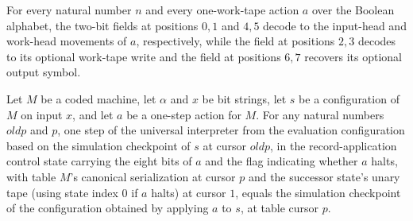 \begin{lemma}
\label{Turing.universalActionBits_decode}
\leanok
{}
For every natural number $n$ and every one-work-tape action $a$ over the Boolean
alphabet, the two-bit fields at positions $0,1$ and $4,5$ decode to the input-head and
work-head movements of $a$, respectively, while the field at positions $2,3$ decodes to
its optional work-tape write and the field at positions $6,7$ recovers its optional
output symbol.
\end{lemma}

\begin{lemma}
\label{Turing.universal_apply_record}
\leanok
{}
Let $M$ be a coded machine, let $\alpha$ and $x$ be bit strings, let $s$ be a
configuration of $M$ on input $x$, and let $a$ be a one-step action for $M$. For any
natural numbers $\mathit{oldp}$ and $p$, one step of the universal interpreter from the
evaluation configuration based on the simulation checkpoint of $s$ at cursor
$\mathit{oldp}$, in the record-application control state carrying the eight bits of $a$
and the flag indicating whether $a$ halts, with table $M$’s canonical serialization at
cursor $p$ and the successor state’s unary tape (using state index $0$ if $a$ halts) at
cursor $1$, equals the simulation checkpoint of the configuration obtained by applying
$a$ to $s$, at table cursor $p$.
\end{lemma}

